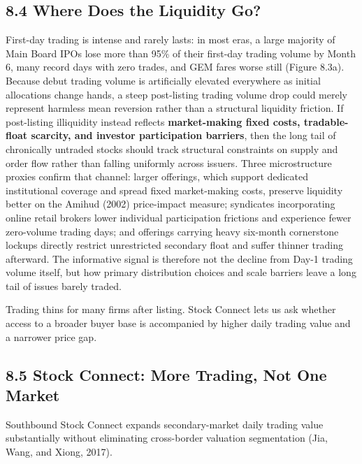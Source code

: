 \documentclass[11pt,letterpaper]{article}
\begin{document}
\subsection*{\texorpdfstring{8.4 Where Does the Liquidity Go?}{8.4 Where Does the Liquidity Go?}}
First-day trading is intense and rarely lasts: in most eras, a large majority of Main Board IPOs lose more than 95\% of their first-day trading volume by Month 6, many record days with zero trades, and GEM fares worse still (Figure 8.3a). Because debut trading volume is artificially elevated everywhere as initial allocations change hands, a steep post-listing trading volume drop could merely represent harmless mean reversion rather than a structural liquidity friction. If post-listing illiquidity instead reflects \textbf{market-making fixed costs, tradable-float scarcity, and investor participation barriers}, then the long tail of chronically untraded stocks should track structural constraints on supply and order flow rather than falling uniformly across issuers. Three microstructure proxies confirm that channel: larger offerings, which support dedicated institutional coverage and spread fixed market-making costs, preserve liquidity better on the Amihud (2002) price-impact measure; syndicates incorporating online retail brokers lower individual participation frictions and experience fewer zero-volume trading days; and offerings carrying heavy six-month cornerstone lockups directly restrict unrestricted secondary float and suffer thinner trading afterward. The informative signal is therefore not the decline from Day-1 trading volume itself, but how primary distribution choices and scale barriers leave a long tail of issues barely traded.

Trading thins for many firms after listing. Stock Connect lets us ask whether access to a broader buyer base is accompanied by higher daily trading value and a narrower price gap.

\subsection*{\texorpdfstring{8.5 Stock Connect: More Trading, Not One Market}{8.5 Stock Connect: More Trading, Not One Market}}
Southbound Stock Connect expands secondary-market daily trading value substantially without eliminating cross-border valuation segmentation (Jia, Wang, and Xiong, 2017).
\end{document}
